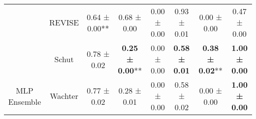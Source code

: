 \begin{table}
{\begin{tabular}[t]{cccccccc}
 & REVISE & 0.64 ± 0.00** & 0.68 ± 0.00\hphantom{*}\hphantom{*} & 0.00 ± 0.00\hphantom{*}\hphantom{*} & 0.93 ± 0.01\hphantom{*}\hphantom{*} & 0.00 ± 0.00\hphantom{*}\hphantom{*} & 0.47 ± 0.00\hphantom{*}\hphantom{*}\\

 & Schut & 0.78 ± 0.02\hphantom{*}\hphantom{*} & \textbf{0.25 ± 0.00}** & 0.00 ± 0.00\hphantom{*}\hphantom{*} & \textbf{0.58 ± 0.01}\hphantom{*}\hphantom{*} & \textbf{0.38 ± 0.02}** & \textbf{1.00 ± 0.00}\hphantom{*}\hphantom{*}\\

\multirow[t]{-9}{*}{\centering\arraybackslash MLP Ensemble} & Wachter & 0.77 ± 0.02\hphantom{*}\hphantom{*} & 0.28 ± 0.01\hphantom{*}\hphantom{*} & 0.00 ± 0.00\hphantom{*}\hphantom{*} & 0.58 ± 0.02\hphantom{*}\hphantom{*} & 0.00 ± 0.00\hphantom{*}\hphantom{*} & \textbf{1.00 ± 0.00}\hphantom{*}\hphantom{*}\\
\bottomrule
\end{tabular}}
\end{table}
